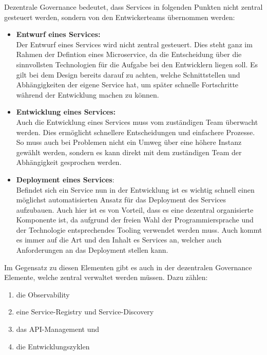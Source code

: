 \begin{definition}
	Dezentrale Governance bedeutet, dass Services in folgenden Punkten nicht zentral gesteuert werden, sondern von den Entwickerteams übernommen werden:\autocites[S. 154]{microservice_enterprise} [Decentralized Governance]{FowlerMicrservices}
	
	\begin{itemize}
		\item \textbf{Entwurf eines Services:}\\
		Der Entwurf eines Services wird nicht zentral gesteuert. Dies steht ganz im Rahmen der Defintion eines Microservice, da die Entscheidung über die sinnvollsten Technologien für die Aufgabe bei den Entwicklern liegen soll. Es gilt bei dem Design bereits darauf zu achten, welche Schnittstellen und Abhängigkeiten der eigene Service hat, um später schnelle Fortschritte während der Entwicklung machen zu können.
		\item \textbf{Entwicklung eines Services:}\\
		Auch die Entwicklung eines Services muss vom zuständigen Team überwacht werden. Dies ermöglicht schnellere Entscheidungen und einfachere Prozesse. So muss auch bei Problemen nicht ein Umweg über eine höhere Instanz gewählt werden, sondern es kann direkt mit dem zuständigen Team der Abhängigkeit gesprochen werden.
		\item \textbf{Deployment eines Services}:\\
		Befindet sich ein Service nun in der Entwicklung ist es wichtig schnell einen möglichst automatisierten Ansatz für das Deployment des Services aufzubauen. Auch hier ist es von Vorteil, dass es eine dezentral organisierte Komponente ist, da aufgrund der freien Wahl der Programmiersprache und der Technologie entsprechendes Tooling verwendet werden muss. Auch kommt es immer auf die Art und den Inhalt es Services an, welcher auch Anforderungen an das Deployment stellen kann.
	\end{itemize}
	Im Gegensatz zu diesen Elementen gibt es auch in der dezentralen Governance Elemente, welche zentral verwaltet werden müssen. Dazu zählen:

	\begin{enumerate}
		\item die Observability
		\item eine Service-Registry und Service-Discovery
		\item das API-Management und
		\item die Entwicklungszyklen
	\end{enumerate}

	
\end{definition}

